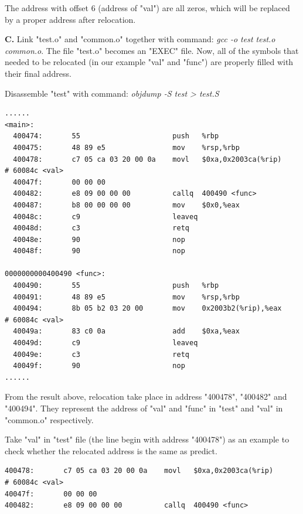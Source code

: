     The address with offset 6 (address of "val") are all zeros, which will be replaced by a proper address after relocation.\newline
    
    \textbf{C.} Link "test.o" and "common.o" together with command: \textit{gcc -o test test.o common.o}. The file "test.o" becomes an "EXEC" file. Now, all of the symbols that needed to be relocated (in our example "val" and "func") are properly filled with their final address. 
    
    Disassemble "test" with command: \textit{objdump -S test > test.S}
    \begin{lstlisting}[caption = Disassemble "test" ]
    ......
<main>: 
  400474:       55                      push   %rbp 
  400475:       48 89 e5                mov    %rsp,%rbp 
  400478:       c7 05 ca 03 20 00 0a    movl   $0xa,0x2003ca(%rip)        # 60084c <val> 
  40047f:       00 00 00 
  400482:       e8 09 00 00 00          callq  400490 <func> 
  400487:       b8 00 00 00 00          mov    $0x0,%eax 
  40048c:       c9                      leaveq 
  40048d:       c3                      retq 
  40048e:       90                      nop 
  40048f:       90                      nop 

0000000000400490 <func>: 
  400490:       55                      push   %rbp 
  400491:       48 89 e5                mov    %rsp,%rbp 
  400494:       8b 05 b2 03 20 00       mov    0x2003b2(%rip),%eax        # 60084c <val> 
  40049a:       83 c0 0a                add    $0xa,%eax 
  40049d:       c9                      leaveq 
  40049e:       c3                      retq 
  40049f:       90                      nop 
......
    \end{lstlisting}
    
     From the result above, relocation take place in address "400478", "400482" and "400494". They represent the address of "val" and "func" in "test" and "val" in "common.o" respectively. 
     
     Take "val" in "test" file (the line begin with address "400478") as an example to check whether the relocated address is the same as predict. 
     
     \begin{lstlisting}[caption = Relocation address calculation ]
400478:       c7 05 ca 03 20 00 0a    movl   $0xa,0x2003ca(%rip)        # 60084c <val> 
40047f:       00 00 00 
400482:       e8 09 00 00 00          callq  400490 <func> 
     \end{lstlisting}
     
